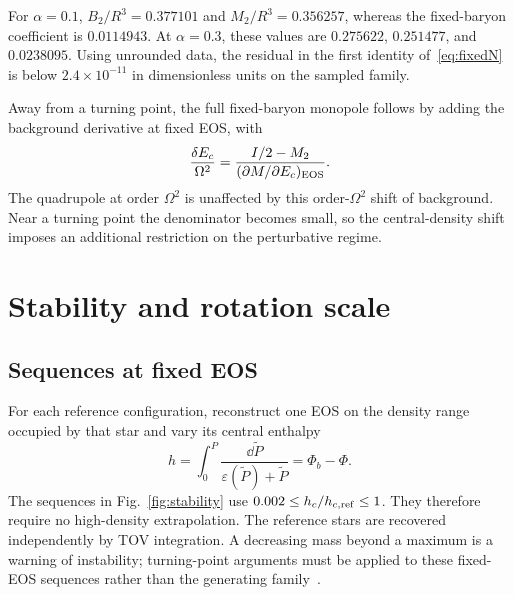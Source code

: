 For $\alpha=0.1$, $B_2/R^3=0.377101$ and $M_2/R^3=0.356257$, whereas the fixed-baryon coefficient is $0.0114943$. At $\alpha=0.3$, these values are $0.275622$, $0.251477$, and $0.0238095$. Using unrounded data, the residual in the first identity of~\eqref{eq:fixedN} is below $2.4\times10^{-11}$ in dimensionless units on the sampled family.

Away from a turning point, the full fixed-baryon monopole follows by adding the background derivative at fixed EOS, with
\begin{equation}
 \frac{\delta E_c}{\Omega^2}=
 \frac{I/2-M_2}{(\partial M/\partial E_c)_{\rm EOS}}.
\end{equation}
The quadrupole at order $\Omega^2$ is unaffected by this order-$\Omega^2$ shift of background. Near a turning point the denominator becomes small, so the central-density shift imposes an additional restriction on the perturbative regime.

\section{Stability and rotation scale}
\subsection{Sequences at fixed EOS}
For each reference configuration, reconstruct one EOS on the density range occupied by that star and vary its central enthalpy
\begin{equation}
 h=\int_0^P\frac{\dd\widetilde P}{\varepsilon(\widetilde P)+\widetilde P}
   =\Phi_b-\Phi.
\end{equation}
The sequences in Fig.~\ref{fig:stability} use $0.002\le h_c/h_{c,\rm ref}\le1$. They therefore require no high-density extrapolation. The reference stars are recovered independently by TOV integration. A decreasing mass beyond a maximum is a warning of instability; turning-point arguments must be applied to these fixed-EOS sequences rather than the generating family~\cite{btm,fis}.

